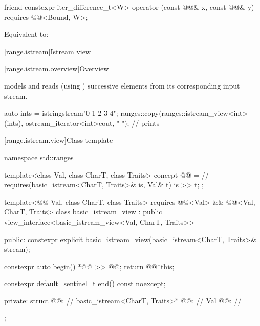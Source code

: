 \begin{itemdecl}
friend constexpr iter_difference_t<W> operator-(const @@& x, const @@& y)
  requires @@<Bound, W>;
\end{itemdecl}

\begin{itemdescr}
\pnum
\effects
Equivalent to: 
\end{itemdescr}

[range.istream]{Istream view}

[range.istream.overview]{Overview}

\pnum
{} models  and
reads (using ) successive elements
from its corresponding input stream.

\pnum
\begin{example}
\begin{codeblock}
auto ints = istringstream{"0 1  2   3     4"};
ranges::copy(ranges::istream_view<int>(ints), ostream_iterator<int>{cout, "-"});
// prints 
\end{codeblock}
\end{example}

[range.istream.view]{Class template }

%
\begin{codeblock}
namespace std::ranges {
  template<class Val, class CharT, class Traits>
    concept @@ =                // \expos
      requires(basic_istream<CharT, Traits>& is, Val& t) {
         is >> t;
      };

  template<@@ Val, class CharT, class Traits>
    requires @@<Val> &&
             @@<Val, CharT, Traits>
  class basic_istream_view : public view_interface<basic_istream_view<Val, CharT, Traits>> {
  public:
    constexpr explicit basic_istream_view(basic_istream<CharT, Traits>& stream);

    constexpr auto begin()
    {
      *@@ >> @@;
      return @@{*this};
    }

    constexpr default_sentinel_t end() const noexcept;

  private:
    struct @@;                            // \expos
    basic_istream<CharT, Traits>* @@;      // \expos
    Val @@;                                 // \expos
  };
}
\end{codeblock}

